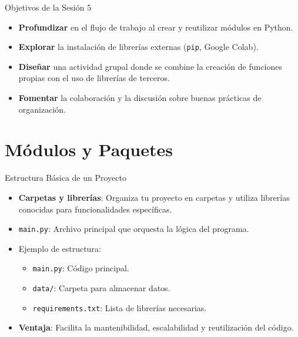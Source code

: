 \documentclass[10pt]{beamer}
\begin{document}
\begin{frame}{Objetivos de la Sesión 5}
  \begin{itemize}
    \item \textbf{Profundizar} en el flujo de trabajo al crear y reutilizar módulos en Python.
    \item \textbf{Explorar} la instalación de librerías externas (\texttt{pip}, Google Colab).
    \item \textbf{Diseñar} una actividad grupal donde se combine la creación de funciones propias con el uso de librerías de terceros.
    \item \textbf{Fomentar} la colaboración y la discusión sobre buenas prácticas de organización.
  \end{itemize}
\end{frame}

\section{Módulos y Paquetes}

\begin{frame}{Estructura Básica de un Proyecto}
  \begin{itemize}
    \item \textbf{Carpetas y librerías}: Organiza tu proyecto en carpetas y utiliza librerías conocidas para funcionalidades específicas.
    \item \texttt{main.py}: Archivo principal que orquesta la lógica del programa.
    \item Ejemplo de estructura:
      \begin{itemize}
        \item \texttt{main.py}: Código principal.
        \item \texttt{data/}: Carpeta para almacenar datos.
        \item \texttt{requirements.txt}: Lista de librerías necesarias.
      \end{itemize}
    \item \textbf{Ventaja}: Facilita la mantenibilidad, escalabilidad y reutilización del código.
  \end{itemize}
\end{frame}
\end{document}
